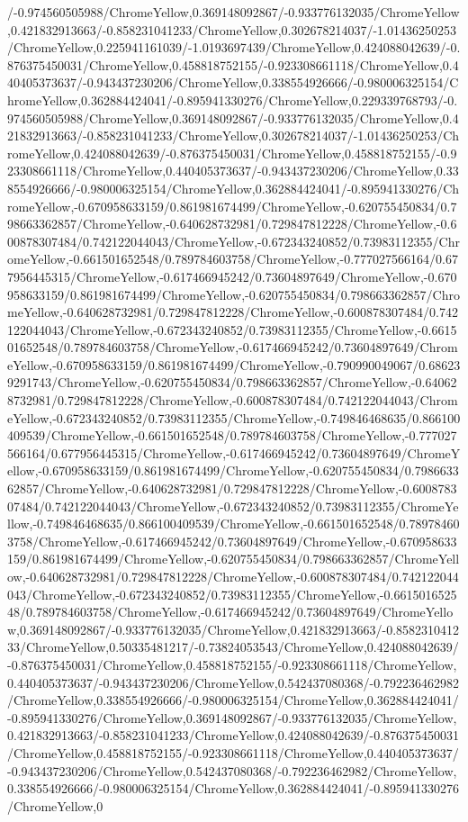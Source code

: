 {\begin{tikzternal}
{/-0.974560505988/ChromeYellow,0.369148092867/-0.933776132035/ChromeYellow,0.421832913663/-0.858231041233/ChromeYellow,0.302678214037/-1.01436250253/ChromeYellow,0.225941161039/-1.0193697439/ChromeYellow,0.424088042639/-0.876375450031/ChromeYellow,0.458818752155/-0.923308661118/ChromeYellow,0.440405373637/-0.943437230206/ChromeYellow,0.338554926666/-0.980006325154/ChromeYellow,0.362884424041/-0.895941330276/ChromeYellow,0.229339768793/-0.974560505988/ChromeYellow,0.369148092867/-0.933776132035/ChromeYellow,0.421832913663/-0.858231041233/ChromeYellow,0.302678214037/-1.01436250253/ChromeYellow,0.424088042639/-0.876375450031/ChromeYellow,0.458818752155/-0.923308661118/ChromeYellow,0.440405373637/-0.943437230206/ChromeYellow,0.338554926666/-0.980006325154/ChromeYellow,0.362884424041/-0.895941330276/ChromeYellow,-0.670958633159/0.861981674499/ChromeYellow,-0.620755450834/0.798663362857/ChromeYellow,-0.640628732981/0.729847812228/ChromeYellow,-0.600878307484/0.742122044043/ChromeYellow,-0.672343240852/0.73983112355/ChromeYellow,-0.661501652548/0.789784603758/ChromeYellow,-0.777027566164/0.677956445315/ChromeYellow,-0.617466945242/0.73604897649/ChromeYellow,-0.670958633159/0.861981674499/ChromeYellow,-0.620755450834/0.798663362857/ChromeYellow,-0.640628732981/0.729847812228/ChromeYellow,-0.600878307484/0.742122044043/ChromeYellow,-0.672343240852/0.73983112355/ChromeYellow,-0.661501652548/0.789784603758/ChromeYellow,-0.617466945242/0.73604897649/ChromeYellow,-0.670958633159/0.861981674499/ChromeYellow,-0.790990049067/0.686239291743/ChromeYellow,-0.620755450834/0.798663362857/ChromeYellow,-0.640628732981/0.729847812228/ChromeYellow,-0.600878307484/0.742122044043/ChromeYellow,-0.672343240852/0.73983112355/ChromeYellow,-0.749846468635/0.866100409539/ChromeYellow,-0.661501652548/0.789784603758/ChromeYellow,-0.777027566164/0.677956445315/ChromeYellow,-0.617466945242/0.73604897649/ChromeYellow,-0.670958633159/0.861981674499/ChromeYellow,-0.620755450834/0.798663362857/ChromeYellow,-0.640628732981/0.729847812228/ChromeYellow,-0.600878307484/0.742122044043/ChromeYellow,-0.672343240852/0.73983112355/ChromeYellow,-0.749846468635/0.866100409539/ChromeYellow,-0.661501652548/0.789784603758/ChromeYellow,-0.617466945242/0.73604897649/ChromeYellow,-0.670958633159/0.861981674499/ChromeYellow,-0.620755450834/0.798663362857/ChromeYellow,-0.640628732981/0.729847812228/ChromeYellow,-0.600878307484/0.742122044043/ChromeYellow,-0.672343240852/0.73983112355/ChromeYellow,-0.661501652548/0.789784603758/ChromeYellow,-0.617466945242/0.73604897649/ChromeYellow,0.369148092867/-0.933776132035/ChromeYellow,0.421832913663/-0.858231041233/ChromeYellow,0.50335481217/-0.73824053543/ChromeYellow,0.424088042639/-0.876375450031/ChromeYellow,0.458818752155/-0.923308661118/ChromeYellow,0.440405373637/-0.943437230206/ChromeYellow,0.542437080368/-0.792236462982/ChromeYellow,0.338554926666/-0.980006325154/ChromeYellow,0.362884424041/-0.895941330276/ChromeYellow,0.369148092867/-0.933776132035/ChromeYellow,0.421832913663/-0.858231041233/ChromeYellow,0.424088042639/-0.876375450031/ChromeYellow,0.458818752155/-0.923308661118/ChromeYellow,0.440405373637/-0.943437230206/ChromeYellow,0.542437080368/-0.792236462982/ChromeYellow,0.338554926666/-0.980006325154/ChromeYellow,0.362884424041/-0.895941330276/ChromeYellow,0}
\end{tikzternal}}
